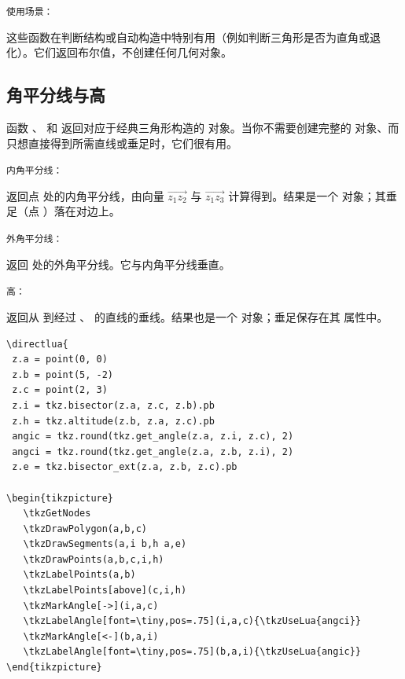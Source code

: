 \medskip
\texttt{使用场景：}

这些函数在判断结构或自动构造中特别有用（例如判断三角形是否为直角或退化）。它们返回布尔值，不创建任何几何对象。

\subsection{角平分线与高}
\label{sub:bisector_and_altitude}

函数 、 和  返回对应于经典三角形构造的  对象。当你不需要创建完整的  对象、而只想直接得到所需直线或垂足时，它们很有用。

\medskip
\texttt{内角平分线：}

 返回点  处的内角平分线，由向量 $\overrightarrow{z_1z_2}$ 与 $\overrightarrow{z_1z_3}$ 计算得到。结果是一个  对象；其垂足（点 ）落在对边上。

\medskip
\texttt{外角平分线：}

 返回  处的外角平分线。它与内角平分线垂直。

\medskip
\texttt{高：}

 返回从  到经过 、 的直线的垂线。结果也是一个  对象；垂足保存在其  属性中。

\begin{verbatim}
\directlua{
 z.a = point(0, 0)
 z.b = point(5, -2)
 z.c = point(2, 3)
 z.i = tkz.bisector(z.a, z.c, z.b).pb
 z.h = tkz.altitude(z.b, z.a, z.c).pb
 angic = tkz.round(tkz.get_angle(z.a, z.i, z.c), 2)
 angci = tkz.round(tkz.get_angle(z.a, z.b, z.i), 2)
 z.e = tkz.bisector_ext(z.a, z.b, z.c).pb

\begin{tikzpicture}
   \tkzGetNodes
   \tkzDrawPolygon(a,b,c)
   \tkzDrawSegments(a,i b,h a,e)
   \tkzDrawPoints(a,b,c,i,h)
   \tkzLabelPoints(a,b)
   \tkzLabelPoints[above](c,i,h)
   \tkzMarkAngle[->](i,a,c)
   \tkzLabelAngle[font=\tiny,pos=.75](i,a,c){\tkzUseLua{angci}}
   \tkzMarkAngle[<-](b,a,i)
   \tkzLabelAngle[font=\tiny,pos=.75](b,a,i){\tkzUseLua{angic}}
\end{tikzpicture}
\end{verbatim}




